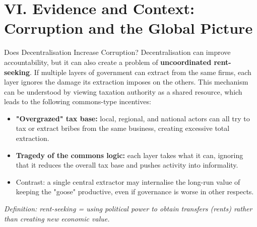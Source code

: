 \documentclass[10pt]{beamer}
\begin{document}
\section{VI. Evidence and Context: Corruption and the Global Picture}

\begin{frame}[allowframebreaks]{Does Decentralisation Increase Corruption?}
Decentralisation can improve accountability, but it can also create a problem of \textbf{uncoordinated rent-seeking}.
If multiple layers of government can extract from the same firms, each layer ignores the damage its extraction imposes on the others. This mechanism can be understood by viewing taxation authority as a shared resource, which leads to the following commons-type incentives:

\begin{itemize}
\item \textbf{"Overgrazed" tax base:} local, regional, and national actors can all try to tax or extract bribes from the same business, creating excessive total extraction.
\item \textbf{Tragedy of the commons logic:} each layer takes what it can, ignoring that it reduces the overall tax base and pushes activity into informality.
\item Contrast: a single central extractor may internalise the long-run value of keeping the "goose" productive, even if governance is worse in other respects.
\end{itemize}

\vspace{0.1cm}
\footnotesize
\textit{Definition: rent-seeking = using political power to obtain transfers (rents) rather than creating new economic value.}
\end{frame}
\end{document}
